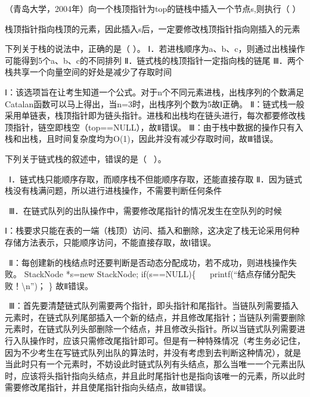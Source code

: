 \question （青岛大学，2004年）向一个栈顶指针为top的链栈中插入一个节点s,则执行（ ）
\par{}
\begin{solution}栈顶指针指向栈顶的元素，因此插入s后，一定要修改栈顶指针指向刚插入的元素
\end{solution}
\question 下列关于栈的说法中，正确的是（ ）。
Ⅰ．若进栈顺序为a、b、c，则通过出栈操作可能得到5个a、b、c的不同排列
Ⅱ．链式栈的栈顶指针一定指向栈的链尾
Ⅲ．两个栈共享一个向量空间的好处是减少了存取时间
\par{}
\begin{solution}Ⅰ：该选项旨在让考生知道一个公式。对于n个不同元素进栈，出栈序列的个数满足Catalan函数可以马上得出，当n=3时，出栈序列个数为5故Ⅰ正确。
Ⅱ：链式栈一般采用单链表，栈顶指针即为链头指针。进栈和出栈均在链头进行，每次都要修改栈顶指针，链空即栈空（top==NULL），故Ⅱ错误。
Ⅲ：由于栈中数据的操作只有入栈和出栈，且时间复杂度均为O(1)，因此并没有减少存取时间，故Ⅲ错误。
\end{solution}
\question 下列关于链式栈的叙述中，错误的是（ ~）。

~Ⅰ．链式栈只能顺序存取，而顺序栈不但能顺序存取，还能直接存取
Ⅱ．因为链式栈没有栈满问题，所以进行进栈操作，不需要判断任何条件

~Ⅲ．在链式队列的出队操作中，需要修改尾指针的情况发生在空队列的时候
\par{}
\begin{solution}Ⅰ：栈要求只能在表的一端（栈顶）访问、插入和删除，这决定了栈无论采用何种存储方法表示，只能顺序访问，不能直接存取，故Ⅰ错误。

~Ⅱ：每创建新的栈结点时还要判断是否动态分配成功，若不成功，则进栈操作失败。
StackNode *s=new StackNode; if(s==NULL)\{ ~
~printf(``结点存储分配失败！\textbackslash{}n'')； \} 故Ⅱ错误。

~Ⅲ：首先要清楚链式队列需要两个指针，即头指针和尾指针。当链队列需要插入元素时，在链式队列尾部插入一个新的结点，并且修改尾指针；当链队列需要删除元素时，在链式队列头部删除一个结点，并且修改头指针。所以当链式队列需要进行入队操作时，应该只需修改尾指针即可。但是有一种特殊情况（考生务必记住，因为不少考生在写链式队列出队的算法时，并没有考虑到去判断这种情况），就是当此时只有一个元素时，不妨设此时链式队列有头结点，那么当唯一一个元素出队时，应该将头指针指向头结点，并且此时尾指针也是指向该唯一的元素，所以此时需要修改尾指针，并且使尾指针指向头结点，故Ⅲ错误。
\end{solution}

